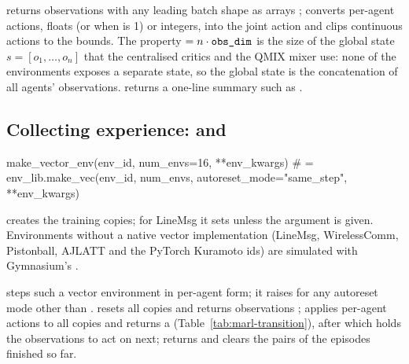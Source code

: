  returns observations with any leading batch shape
as  arrays ;
 converts per-agent actions,
 floats (or 
when  is 1) or  integers, into the
joint action and clips continuous actions to the bounds. The property
 $= n \cdot \texttt{obs\_dim}$ is the size of the global state
$s = [o_1, \dots, o_n]$ that the centralised critics and the QMIX mixer use:
none of the environments exposes a separate state, so the global state is the
concatenation of all agents' observations.  returns a one-line
summary such as .

\subsection{Collecting experience: \texorpdfstring{}{VectorRunner} and \texorpdfstring{}{Transition}}\label{sec:marl-runner}

\begin{pycode}
make_vector_env(env_id, num_envs=16, **env_kwargs)
# = env_lib.make_vec(env_id, num_envs, autoreset_mode="same_step", **env_kwargs)
\end{pycode}
creates the training copies; for LineMsg it sets
 unless the argument is given. Environments without a native vector implementation (LineMsg,
WirelessComm, Pistonball, AJLATT and the PyTorch Kuramoto ids) are simulated
with Gymnasium's .

 steps such a vector environment in
per-agent form; it raises  for any autoreset mode other than
.  resets all copies and returns
observations ;  applies per-agent
actions to all copies and returns a 
(Table~\ref{tab:marl-transition}), after which  holds the
observations to act on next;  returns and clears the
 pairs of the episodes finished so far.

